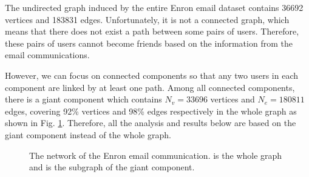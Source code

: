 \documentclass[journal]{IEEEtran}
\begin{document}
The undirected graph induced by the entire Enron email dataset contains 36692 vertices and 183831 edges. Unfortunately, it is not a connected graph, which means that there does not exist a path between some pairs of users. Therefore, these pairs of users cannot become friends based on the information from the email communications. 

However, we can focus on connected components so that any two users in each component are linked by at least one path. Among all connected components, there is a giant component which contains $N_{v} = 33696$ vertices and $N_{e} = 180811$ edges, covering 92\% vertices and 98\% edges respectively in the whole graph as shown in Fig. \ref{fig:1}. Therefore, all the analysis and results below are based on the giant component instead of the whole graph.

\begin{figure}[!t]
\centering
{}
\hfil
{}
\caption{The network of the Enron email communication. \protect{} is the whole graph and \protect{} is the subgraph of the giant component.}
\label{fig:1}
\end{figure}
\end{document}
